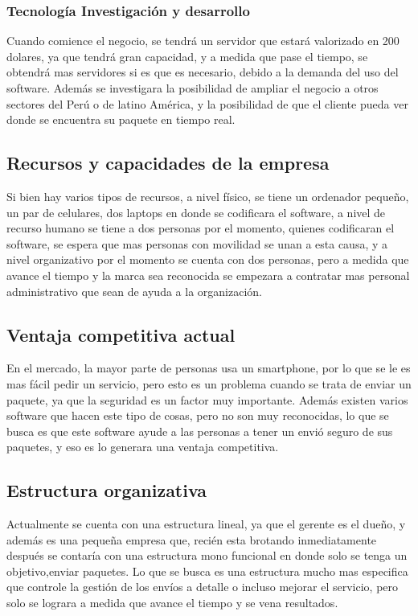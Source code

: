 \subsubsection{Tecnología Investigación y desarrollo}
Cuando comience el negocio, se tendrá un servidor que estará valorizado en 200 dolares, ya que tendrá gran capacidad, y a medida que pase el tiempo, se obtendrá mas servidores si es que es necesario, debido a la demanda del uso del software. Además se investigara la posibilidad de ampliar el negocio a otros sectores del Perú o de latino América, y la posibilidad de que el cliente pueda ver donde se encuentra su paquete en tiempo real.  

\subsection{Recursos y capacidades de la empresa}
Si bien hay varios tipos de recursos, a nivel físico, se tiene un ordenador pequeño, un par de celulares, dos laptops en donde se codificara el software, a nivel de recurso humano se tiene a dos personas por el momento, quienes codificaran el software, se espera que mas personas con movilidad se unan a esta causa, y a nivel organizativo por el momento se cuenta con dos personas, pero a medida que avance el tiempo y la marca sea reconocida se empezara a contratar mas personal administrativo que sean de ayuda a la organización.

\subsection{Ventaja competitiva actual}
En el mercado, la mayor parte de personas usa un smartphone, por lo que se le es mas fácil pedir un servicio, pero esto es un problema cuando se trata de enviar un paquete, ya que la seguridad es un factor muy importante. Además existen varios software que hacen este tipo de cosas, pero no son muy reconocidas, lo que se busca es que este software ayude a las personas a tener un envió seguro de sus paquetes, y eso es lo generara una ventaja competitiva. 

\subsection{Estructura organizativa}
Actualmente se cuenta con una estructura lineal, ya que el gerente es el dueño, y además es una pequeña empresa que, recién esta brotando inmediatamente después se contaría con una estructura mono funcional en donde solo se tenga un objetivo,enviar paquetes. Lo que se busca es una estructura mucho mas especifica que controle la gestión de los envíos a detalle o incluso mejorar el servicio, pero solo se lograra a medida que avance el tiempo y se vena resultados.

